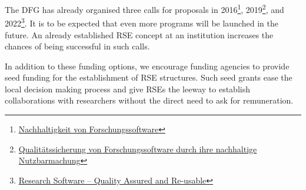 \documentclass[a4paper]{article}
\begin{document}
\begin{enumerate}
      The DFG has already organised three calls for proposals in 2016\footnote{\href{https://www.dfg.de/resource/blob/172674/1bcb181a6451fdac9d94421776b52798/161026-dfg-ausschreibung-forschungssoftware-de-data.pdf}{Nachhaltigkeit von Forschungssoftware}}, 2019\footnote{\href{https://www.dfg.de/de/aktuelles/neuigkeiten-themen/info-wissenschaft/2019/info-wissenschaft-19-44}{Qualitätssicherung von Forschungssoftware durch ihre nachhaltige Nutzbarmachung}}, and 2022\footnote{\href{https://www.dfg.de/en/news/news-topics/announcements-proposals/2022/info-wissenschaft-22-85}{Research Software – Quality Assured and Re-usable}}\autocite{katerbow_dfg_rse_funding_2018}.
      It is to be expected that even more programs will be launched in the future.
      An already established RSE concept at an institution increases the chances of being successful in such calls.
\end{enumerate}

In addition to these funding options, we encourage funding agencies to provide seed funding for the establishment of RSE structures.
Such seed grants ease the local decision making process and give RSEs the leeway to establish collaborations with researchers without the direct need to ask for remuneration.

\end{document}
